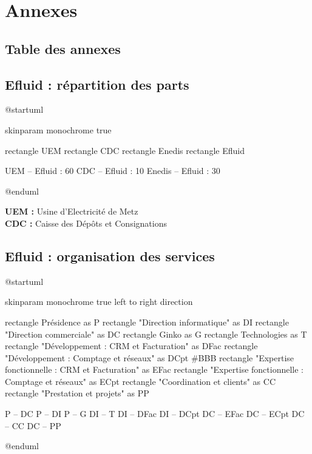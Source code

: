 \documentclass[a4paper, 12pt]{report}
\begin{document}
\part{Annexes}
\renewcommand{\clearpage}{}
\chapter*{Table des annexes}
\renewcommand\ptctitle{}
\parttoc
\thispagestyle{empty}
\renewcommand{\clearpage}{\newpage}
\appendix


\chapter{Efluid : répartition des parts}
\label{appendix:efluid-parts}

\begin{center}
  \begin{plantuml}
    @startuml

    skinparam monochrome true

    rectangle UEM
    rectangle CDC
    rectangle Enedis
    rectangle Efluid
    
    UEM -- Efluid : 60%
    CDC -- Efluid : 10%
    Enedis -- Efluid : 30%

    @enduml
  \end{plantuml}
\end{center}

\vspace{1cm}
\noindent\textbf{UEM :} Usine d'Electricité de Metz\\
\noindent\textbf{CDC :} Caisse des Dépôts et Consignations


\chapter{Efluid : organisation des services}
\label{appendix:efluid-organisation}

\begin{center}
  \begin{plantuml}
    @startuml

    skinparam monochrome true
    left to right direction

    rectangle Présidence as P
    rectangle "Direction informatique" as DI
    rectangle "Direction commerciale" as DC
    rectangle Ginko as G
    rectangle Technologies as T
    rectangle "Développement : CRM et Facturation" as DFac
    rectangle "Développement : Comptage et réseaux" as DCpt #BBB
    rectangle "Expertise fonctionnelle : CRM et Facturation" as EFac
    rectangle "Expertise fonctionnelle : Comptage et réseaux" as ECpt
    rectangle "Coordination et clients" as CC
    rectangle "Prestation et projets" as PP

    P -- DC
    P -- DI
    P -- G
    DI -- T
    DI -- DFac
    DI -- DCpt
    DC -- EFac
    DC -- ECpt
    DC -- CC
    DC -- PP

    @enduml
  \end{plantuml}
\end{center}
\end{document}
